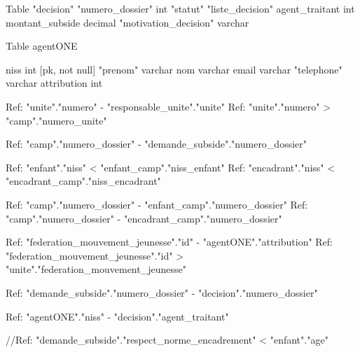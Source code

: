 Table "decision" {
  "numero_dossier" int
  "statut" "liste_decision"
  agent_traitant int
  montant_subside decimal
  "motivation_decision" varchar
}


Table agentONE {
  niss int [pk, not null]
  "prenom" varchar
  nom varchar
  email varchar
  "telephone" varchar
  attribution int
  
}


Ref: "unite"."numero" - "responsable_unite"."unite"
Ref: "unite"."numero" > "camp"."numero_unite"

Ref: "camp"."numero_dossier" - "demande_subside"."numero_dossier"

Ref: "enfant"."niss" < "enfant_camp"."niss_enfant"
Ref: "encadrant"."niss" < "encadrant_camp"."niss_encadrant"

Ref: "camp"."numero_dossier" - "enfant_camp"."numero_dossier"
Ref: "camp"."numero_dossier" - "encadrant_camp"."numero_dossier"

Ref: "federation_mouvement_jeunesse"."id" - "agentONE"."attribution"
Ref: "federation_mouvement_jeunesse"."id" > "unite"."federation_mouvement_jeunesse"

Ref: "demande_subside"."numero_dossier" - "decision"."numero_dossier"

Ref: "agentONE"."niss" - "decision"."agent_traitant"

//Ref: "demande_subside"."respect_norme_encadrement" < "enfant"."age"